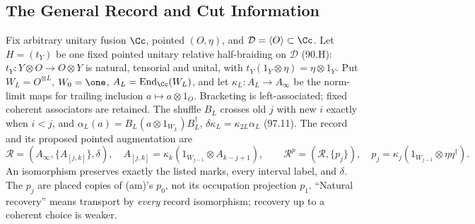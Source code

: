 \subsection{The General Record and Cut Information}

Fix arbitrary unitary fusion \(\Cc\), pointed \((O,\eta)\), and \(\mathcal D=\langle O\rangle\subset\Cc\).
Let \(H=(t_Y)\) be one fixed pointed unitary relative half-braiding on \(\mathcal D\) (90.H):
\(t_Y:Y\otimes O\to O\otimes Y\) is natural, tensorial and unital, with
\(t_Y(1_Y\otimes\eta)=\eta\otimes1_Y\). Put \(W_L=O^{\otimes L}\), \(W_0=\one\),
\(A_L=\operatorname{End}_{\Cc}(W_L)\), and let \(\kappa_L:A_L\to A_\infty\) be the norm-limit maps
for trailing inclusion \(a\mapsto a\otimes1_O\). Bracketing is left-associated; fixed coherent associators are retained.
The shuffle \(B_L\) crosses old \(j\) with new \(i\) exactly when \(i<j\), and
\(\alpha_L(a)=B_L(a\otimes1_{W_L})B_L^\dagger\), \(\delta\kappa_L=\kappa_{2L}\alpha_L\) (97.11).
The record and its proposed pointed augmentation are
\[
 \mathcal R=(A_\infty,\{A_{[j,k]}\},\delta),\quad
 A_{[j,k]}=\kappa_k(1_{W_{j-1}}\otimes A_{k-j+1}),\qquad
 \mathcal R^p=(\mathcal R,\{p_j\}),\quad p_j=\kappa_j(1_{W_{j-1}}\otimes\eta\eta^\dagger).
\]
An isomorphism preserves exactly the listed marks, every interval label, and \(\delta\).
The \(p_j\) are placed copies of (am)'s \(p_0\), not its occupation projection \(p_1\).
``Natural recovery'' means transport by \emph{every} record isomorphism; recovery up to a coherent choice is weaker.

